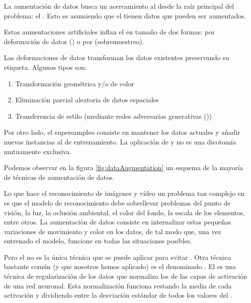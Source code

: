 La aumentación de datos busca un acercamiento al  desde la raíz principal del problema: el . Esto es asumiendo que el  tienen datos que pueden ser aumentados.

Estas aumentaciones artificiales inflan el  en tamaño de dos formas: por deformación de datos () o por  (sobremuestreo).

Las deformaciones de datos transforman los datos existentes preservando su etiqueta. Algunos tipos son:

\begin{enumerate}
  \item Transformación geométrica y/o de color
  \item Eliminación parcial aleatoria de datos espaciales
  \item Transferencia de estilo (mediante redes adversarias generativas ())
\end{enumerate}

Por otro lado, el supersampleo consiste en mantener los datos actuales y añadir nuevas instancias al  de entrenamiento. La aplicación de  y  no es una dicotomía mutuamente exclusiva.

Podemos observar en la figura \ref{fig:dataAugmentation} un esquema de la mayoría de técnicas de aumentación de datos.


Lo que hace el reconocimiento de imágenes y vídeo un problema tan complejo en  es que el modelo de reconocimiento debe sobrellevar problemas del punto de visión, la luz, la oclusión ambiental, el color del fondo, la escala de los elementos, entre otros. La aumentación de datos consiste en internalizar estas pequeñas variaciones de movimiento y color en los datos, de tal modo que, una vez entrenado el modelo, funcione en todas las situaciones posibles.

Pero el  no es la única técnica que se puede aplicar para evitar . Otra técnica bastante común (y que nosotros hemos aplicado) es el denominado . El  es una técnica de regularización de los datos que normaliza los  de las capas de activación de una red neuronal. Esta normalización funciona restando la media de cada activación y dividiendo entre la desviación estándar de todos los valores del  .
